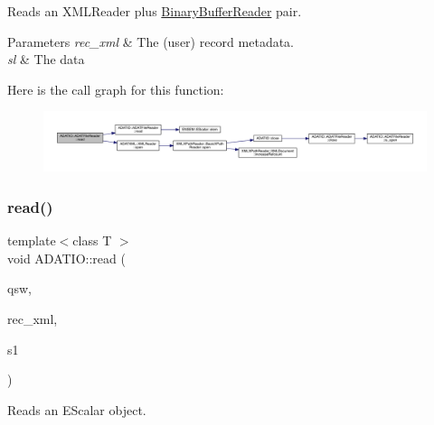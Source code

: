 Reads an X\+M\+L\+Reader plus \mbox{\hyperlink{classADATIO_1_1BinaryBufferReader}{Binary\+Buffer\+Reader}} pair. 


\begin{DoxyParams}{Parameters}
{\em rec\+\_\+xml} & The (user) record metadata. \\
\hline
{\em sl} & The data \\
\hline
\end{DoxyParams}
Here is the call graph for this function\+:
\nopagebreak
\begin{figure}[H]
\begin{center}
\leavevmode
\includegraphics[width=350pt]{db/de5/group__qio_gadf1e0b4405e14798a0610efd8774f8d0_cgraph}
\end{center}
\end{figure}
\mbox{\label{group__qio_ga3dd8ea4aebc2b69c0ad2996743816341}} 
\subsubsection{\texorpdfstring{read()}{read()}\hspace{0.1cm}{\footnotesize\ttfamily [5/7]}}
{\footnotesize\ttfamily template$<$class T $>$ \\
void A\+D\+A\+T\+I\+O\+::read (\begin{DoxyParamCaption}\item[{\mbox{\hyperlink{classADATIO_1_1ADATFileReader}{A\+D\+A\+T\+File\+Reader}} \&}]{qsw,  }\item[{\mbox{\hyperlink{classADATXML_1_1XMLReader}{X\+M\+L\+Reader}} \&}]{rec\+\_\+xml,  }\item[{\mbox{\hyperlink{classENSEM_1_1EScalar}{E\+Scalar}}$<$ T $>$ \&}]{s1 }\end{DoxyParamCaption})}



Reads an E\+Scalar object. 


